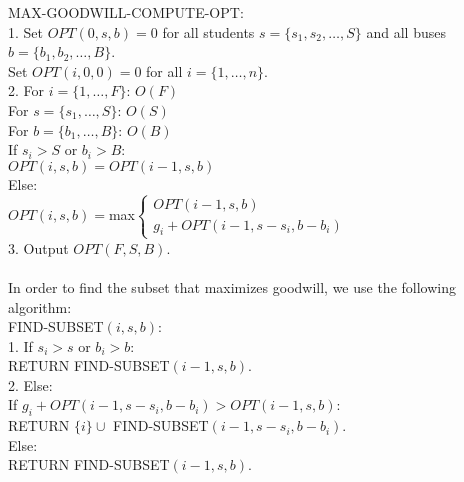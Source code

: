 \documentclass[10pt,letterpaper]{article}
\newcommand\tab[1][0.5cm]{\hspace*{#1}}
\begin{document}
MAX-GOODWILL-COMPUTE-OPT:\\
1. Set $OPT(0,s,b)=0$ for all students $s=\{s_1,s_2,\dots,S\}$ and all buses $b=\{b_1,b_2,\dots,B\}$.\\
Set $OPT(i,0,0)=0$ for all $i=\{1,\dots,n\}$.\\
2. For $i=\{1,\dots,F\}$: $O(F)$\\
\tab For $s=\{s_1,\dots,S\}$: $O(S)$\\
\tab \tab For $b=\{b_1,\dots,B\}$: $O(B)$\\
\tab \tab \tab If $s_i > S$ or $b_i > B$: \\
\tab \tab \tab \tab $OPT(i,s,b)=OPT(i-1,s,b)$\\
\tab \tab \tab Else: \\
\tab \tab \tab \tab $OPT(i,s,b)=$max$
	\begin{cases}
		OPT(i-1,s,b) \\
		g_i+OPT(i-1,s-s_i,b-b_i)
	\end{cases}$\\
3. Output $OPT(F,S,B)$.\\\\
In order to find the subset that maximizes goodwill, we use the following algorithm:\\
FIND-SUBSET$(i,s,b)$:\\
1. If $s_i > s$ or $b_i > b$: \\
\tab RETURN FIND-SUBSET$(i-1,s,b)$.\\
2. Else: \\
\tab If $g_i + OPT(i-1,s-s_i,b-b_i) > OPT(i-1,s,b)$: \\
\tab \tab RETURN $\{i\} \cup $ FIND-SUBSET$(i-1,s-s_i,b-b_i)$.\\
\tab Else: \\
\tab \tab RETURN FIND-SUBSET$(i-1,s,b)$.\\ 

\pagebreak

\end{document}
